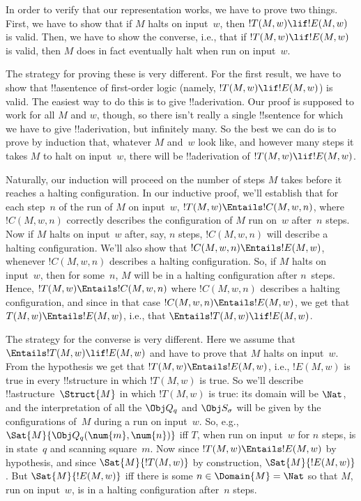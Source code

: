\documentclass[../../../include/open-logic-section]{subfiles}
\begin{document}

\begin{explain}
In order to verify that our representation works, we have to prove two
things. First, we have to show that if $M$ halts on input~$w$, then
$!T(M, w) \lif !E(M, w)$ is valid. Then, we have to show the converse,
i.e., that if $!T(M, w) \lif !E(M, w)$ is valid, then $M$ does in fact
eventually halt when run on input~$w$.

The strategy for proving these is very different. For the first
result, we have to show that !!a{sentence} of first-order logic
(namely, $!T(M, w) \lif !E(M, w)$) is valid. The easiest way to do
this is to give !!a{derivation}. Our proof is supposed to work for all
$M$ and $w$, though, so there isn't really a single !!{sentence} for
which we have to give !!a{derivation}, but infinitely many.  So the best
we can do is to prove by induction that, whatever $M$ and~$w$ look
like, and however many steps it takes $M$ to halt on input~$w$, there
will be !!a{derivation} of $!T(M, w) \lif !E(M, w)$.

Naturally, our induction will proceed on the number of steps $M$ takes
before it reaches a halting configuration. In our inductive proof,
we'll establish that for each step~$n$ of the run of $M$ on input~$w$,
$!T(M, w) \Entails !C(M, w, n)$, where $!C(M, w, n)$ correctly
describes the configuration of $M$ run on~$w$ after~$n$ steps. Now if
$M$ halts on input~$w$ after, say, $n$ steps, $!C(M, w, n)$ will
describe a halting configuration. We'll also show that $!C(M, w, n)
\Entails !E(M, w)$, whenever $!C(M, w, n)$ describes a halting
configuration.  So, if $M$ halts on input~$w$, then for some~$n$, $M$
will be in a halting configuration after $n$~steps. Hence, $!T(M, w)
\Entails !C(M, w, n)$ where $!C(M, w, n)$ describes a halting
configuration, and since in that case $!C(M, w, n) \Entails !E(M, w)$,
we get that $T(M, w) \Entails !E(M, w)$, i.e., that $\Entails !T(M, w)
\lif !E(M, w)$.

The strategy for the converse is very different. Here we assume that
$\Entails !T(M, w) \lif !E(M, w)$ and have to prove that $M$ halts on
input~$w$.  From the hypothesis we get that $!T(M, w) \Entails !E(M,
w)$, i.e., $!E(M, w)$ is true in every !!{structure} in which $!T(M,
w)$ is true. So we'll describe !!a{structure}~$\Struct{M}$ in which
$!T(M, w)$ is true: its domain will be $\Nat$, and the interpretation
of all the $\Obj Q_q$ and $\Obj S_\sigma$ will be given by the
configurations of~$M$ during a run on input~$w$.  So, e.g.,
$\Sat{M}{\Obj Q_q(\num{m}, \num{n})}$ iff $T$, when run on input~$w$
for $n$ steps, is in state~$q$ and scanning square~$m$.  Now since
$!T(M, w) \Entails !E(M, w)$ by hypothesis, and since $\Sat{M}{!T(M,
  w)}$ by construction, $\Sat{M}{!E(M, w)}$.  But $\Sat{M}{!E(M, w)}$
iff there is some $n \in \Domain{M} = \Nat$ so that $M$, run on
input~$w$, is in a halting configuration after~$n$ steps.
\end{explain}
\end{document}
